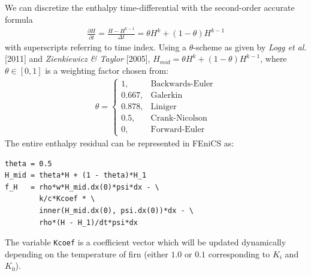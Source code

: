 \documentclass{article}%
\begin{document}
We can discretize the enthalpy time-differential with the second-order accurate formula
\begin{align*}
  \frac{\partial H}{\partial t} = \frac{H - H^{k-1}}{\Delta t} = \theta H^{k}  + (1-\theta) H^{k-1}
\end{align*}
with superscripts referring to time index.  Using a $\theta$-scheme as given by \emph{Logg et al.} [2011] and \emph{Zienkiewicz \& Taylor} [2005], $H_{mid} = \theta H^{k}  + (1-\theta) H^{k-1}$, where $\theta \in [0,1]$ is a weighting factor chosen from: 
\begin{align*}
    \theta = 
    \begin{cases}
      1,       & \text{Backwards-Euler}\\
      0.667,   & \text{Galerkin}\\
      0.878,   & \text{Liniger}\\
      0.5,     & \text{Crank-Nicolson}\\
      0,       & \text{Forward-Euler}
    \end{cases}
\end{align*}
The entire enthalpy residual can be represented in FEniCS as:\par
\footnotesize
\begin{verbatim}
theta = 0.5
H_mid = theta*H + (1 - theta)*H_1
f_H   = rho*w*H_mid.dx(0)*psi*dx - \
        k/c*Kcoef * \ 
        inner(H_mid.dx(0), psi.dx(0))*dx - \
        rho*(H - H_1)/dt*psi*dx
\end{verbatim}
\normalsize
The variable \texttt{Kcoef} is a coefficient vector which will be updated dynamically depending on the temperature of firn (either $1.0$ or $0.1$ corresponding to $K_i$ and $K_0$).
\end{document}
